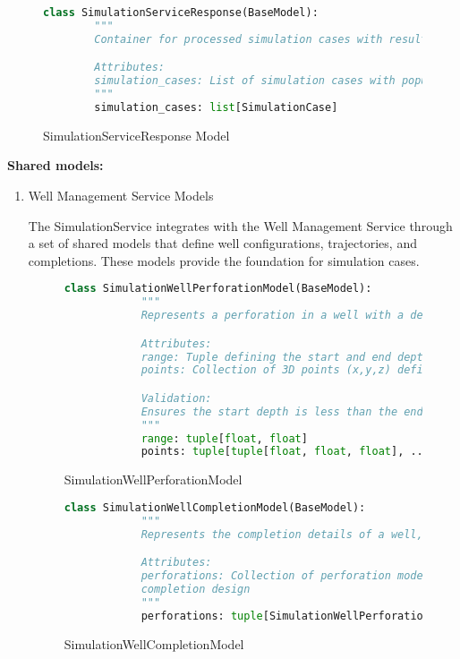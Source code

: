 \begin{figure}[h]
	\begin{lstlisting}[language=Python]
		class SimulationServiceResponse(BaseModel):
		"""
		Container for processed simulation cases with results.

		Attributes:
		simulation_cases: List of simulation cases with populated results
		"""
		simulation_cases: list[SimulationCase]
	\end{lstlisting}
	\caption{SimulationServiceResponse Model}
	\label{fig:SimulationService SimulationServiceResponse Model}
\end{figure}

\textbf{Shared models:}
\begin{enumerate}
	\item Well Management Service Models

	The SimulationService integrates with the Well Management Service through a set of shared models that define well configurations, trajectories, and completions. These models provide the foundation for simulation cases.

	\begin{figure}[H]
		\begin{lstlisting}[language=Python]
			class SimulationWellPerforationModel(BaseModel):
			"""
			Represents a perforation in a well with a depth range and 3D coordinate points.

			Attributes:
			range: Tuple defining the start and end depths of the perforation
			points: Collection of 3D points (x,y,z) defining the perforation geometry

			Validation:
			Ensures the start depth is less than the end depth
			"""
			range: tuple[float, float]
			points: tuple[tuple[float, float, float], ...]
		\end{lstlisting}
		\caption{SimulationWellPerforationModel}
	\end{figure}

	\begin{figure}[H]
		\begin{lstlisting}[language=Python]
			class SimulationWellCompletionModel(BaseModel):
			"""
			Represents the completion details of a well, containing perforations.

			Attributes:
			perforations: Collection of perforation models defining the well's
			completion design
			"""
			perforations: tuple[SimulationWellPerforationModel, ...]
		\end{lstlisting}
		\caption{SimulationWellCompletionModel}
	\end{figure}


\end{enumerate}
